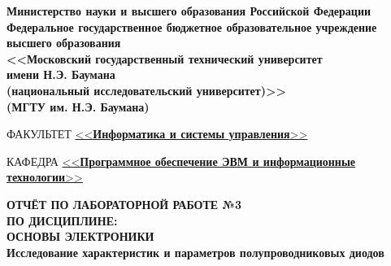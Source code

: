 \begin{titlepage}
	\noindent\begin{minipage}{0.05\textwidth}
	\end{minipage}
	\hfill
	\begin{minipage}{0.85\textwidth}\raggedleft
		\begin{center}
			\fontsize{12pt}{0.3\baselineskip}\selectfont \textbf{Министерство науки и высшего образования Российской Федерации \\ Федеральное государственное бюджетное образовательное учреждение \\ высшего образования \\ <<Московский государственный технический университет \\ имени Н.Э. Баумана \\ (национальный исследовательский университет)>> \\ (МГТУ им. Н.Э. Баумана)}
		\end{center}
	\end{minipage}
	
	\begin{center}
		\fontsize{12pt}{0.1\baselineskip}\selectfont
		\noindent\makebox[\linewidth]{\rule{\textwidth}{4pt}} \makebox[\linewidth]{\rule{\textwidth}{1pt}}
	\end{center}
	
	\begin{flushleft}
		\fontsize{12pt}{0.8\baselineskip}\selectfont 
		
		ФАКУЛЬТЕТ \uline{<<\textbf{Информатика и системы управления}>> \hfill}
		
		КАФЕДРА \uline{\mbox{\hspace{4mm}} <<\textbf{Программное обеспечение ЭВМ и информационные технологии}>> \hfill}
	\end{flushleft}
	
	\vspace{1mm}
	
	\begin{center}
		{
			\fontsize{20pt}{\baselineskip}\selectfont\bfseries
			ОТЧЁТ ПО ЛАБОРАТОРНОЙ РАБОТЕ №3 \\
			ПО ДИСЦИПЛИНЕ: \\
			ОСНОВЫ ЭЛЕКТРОНИКИ\\
		}
		\vspace{5mm}
		{
			\Large \bfseries
			Исследование характеристик и параметров
			полупроводниковых диодов\\
		}
	\end{center}
	

\end{titlepage}
